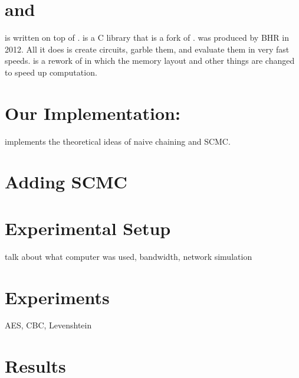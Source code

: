 \section{\LibGarble and \JustGarble}

 \CompGC is written on top of \LibGarble.
\LibGarble is a C library that is a fork of \JustGarble.
\JustGarble was produced by BHR in 2012.
All it does is create circuits, garble them, and evaluate them in very fast speeds.
\LibGarble is a rework of \JustGarble in which the memory layout and other things are changed to speed up computation.

\section{Our Implementation: \CompGC}
\CompGC implements the theoretical ideas of naive chaining and SCMC.



\section{Adding SCMC}
\section{Experimental Setup}
talk about what computer was used, bandwidth, network simulation
\section{Experiments}
AES, CBC, Levenshtein
\section{Results}
